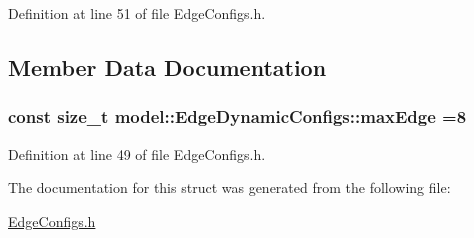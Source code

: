 Definition at line 51 of file Edge\+Configs.\+h.



\subsection{Member Data Documentation}
\hypertarget{structmodel_1_1_edge_dynamic_configs_a4b48bcb3a2f06fb9b47fc91b736a33ae}{}
\subsubsection[{max\+Edge}]{\setlength{\rightskip}{0pt plus 5cm}const size\+\_\+t model\+::\+Edge\+Dynamic\+Configs\+::max\+Edge =8\hspace{0.3cm}{\ttfamily [static]}}\label{structmodel_1_1_edge_dynamic_configs_a4b48bcb3a2f06fb9b47fc91b736a33ae}


Definition at line 49 of file Edge\+Configs.\+h.



The documentation for this struct was generated from the following file\+:\begin{DoxyCompactItemize}
\item 
\hyperlink{_edge_configs_8h}{Edge\+Configs.\+h}\end{DoxyCompactItemize}
